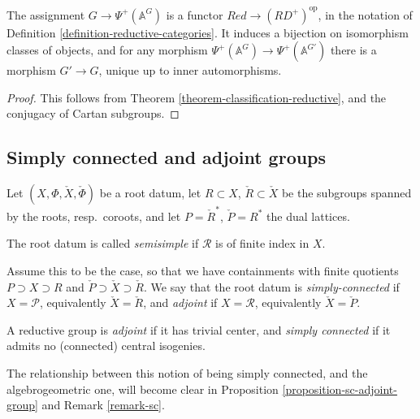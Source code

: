 \begin{theorem}
\label{theorem-classification-with-universal-Cartan}
The assignment $G \to \Psi^+(\mathbb A^G)$ is a functor $Red\to (RD^+)^{\text{op}}$, in the notation of Definition \ref{definition-reductive-categories}. It induces a bijection on isomorphism classes of objects, and for any morphism $\Psi^+(\mathbb A^{G}) \to \Psi^+(\mathbb A^{G'})$ there is a morphism $G'\to G$, unique up to inner automorphisms.
\end{theorem}

\begin{proof}
 This follows from Theorem \ref{theorem-classification-reductive}, and the conjugacy of Cartan subgroups.
\end{proof}





\subsection{Simply connected and adjoint groups}
\label{subsection-simply-connected-adjoint}

\begin{definition}
 \label{definition-sc-adjoint-rootdatum}
Let $(X,\Phi,\check X,\check\Phi)$ be a root datum, let $R\subset X$, $\check R\subset \check X$ be the subgroups spanned by the roots, resp.\ coroots, and let $P = \check R^*$, $\check P = R^*$ the dual lattices. 

The root datum is called {\it semisimple} if $\mathcal R$ is of finite index in $X$. 

Assume this to be the case, so that we have containments with finite quotients $P\supset X\supset R$ and $\check P\supset\check X\supset \check R$. We say that the root datum  is {\it simply-connected} if $X=\mathcal P$, equivalently $\check X=\check R$, and {\it adjoint} if $X=\mathcal R$, equivalently $\check X =\check P$. 
\end{definition}

\begin{definition}
 \label{definition-sc-adjoint-group}
A reductive group is {\it adjoint} if it has trivial center, and {\it simply connected} if it admits no (connected) central isogenies.
\end{definition}

The relationship between this notion of being simply connected, and the algebrogeometric one, will become clear in Proposition  \ref{proposition-sc-adjoint-group} and Remark \ref{remark-sc}.




